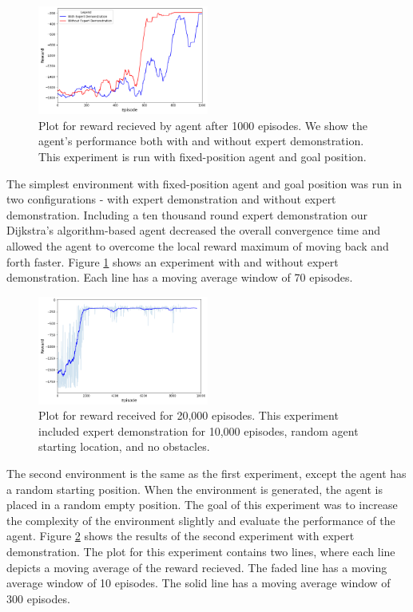 \documentclass[conference]{IEEEtran}
\begin{document}
\begin{figure}
    \centering
    \includegraphics[width=0.5\textwidth]{assets/expertdemonstration.png}
    \caption{Plot for reward recieved by agent after 1000 episodes.
        We show the agent's performance both with and without expert demonstration.
        This experiment is run with fixed-position agent and goal position.}
    \label{fig:expertdemonstration}
\end{figure}

The simplest environment with fixed-position agent and goal position was run in
two configurations - with expert demonstration and without expert demonstration.
Including a ten thousand round expert demonstration our Dijkstra's
algorithm-based agent decreased the overall convergence time and allowed the
agent to overcome the local reward maximum of moving back and forth faster. Figure
\ref{fig:expertdemonstration} shows an experiment with and without expert
demonstration. Each line has a moving average window of 70 episodes.

\begin{figure}
    \centering
    \includegraphics[width=0.5\textwidth]{assets/randomstartnoobs10kep.png}
    \caption{Plot for reward received for 20,000 episodes. This experiment
        included expert demonstration for 10,000 episodes, random agent starting
        location, and no obstacles.}
    \label{fig:randomstartnoobs10kep}
\end{figure}

The second environment is the same as the first experiment, except the agent has
a random starting position. When the environment is generated, the agent is
placed in a random empty position. The goal of this experiment was to increase
the complexity of the environment slightly and evaluate the performance of the
agent.  Figure \ref{fig:randomstartnoobs10kep} shows the results of the second
experiment with expert demonstration. The plot for this experiment contains two
lines, where each line depicts a moving average of the reward recieved. The
faded line has a moving average window of 10 episodes. The solid line has a
moving average window of 300 episodes.
\end{document}
